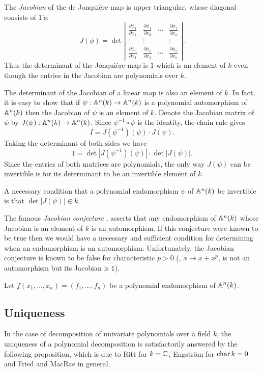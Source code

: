 The {\em Jacobian} of the de Jonqui\`ere map is upper triangular,
whose diagonal consists of $1$'s:
\[
J(\phi) = \det \left|
\begin{array}{cccc}
  \frac{\partial \phi_1}{\partial x_1} & 
    \frac{\partial \phi_1}{\partial x_2} & \cdots & 
    \frac{\partial \phi_1}{\partial x_n} \\
  \vdots & \vdots & & \vdots \\
  \frac{\partial \phi_n}{\partial x_1} & 
    \frac{\partial \phi_n}{\partial x_2} & \cdots & 
    \frac{\partial \phi_n}{\partial x_n} 
\end{array}
\right|.
\]
Thus the determinant of the Jonqui\`ere map is $1$ which is an element
of $k$ even though the entries in the Jacobian are polynomials over
$k$.

The determinant of the Jacobian of a linear map is also an element of
$k$.  In fact, it is easy to show that if $\psi: \mathbb{A}^{n}(k)
\rightarrow \mathbb{A}^n(k)$ is a polynomial automorphism of $\mathbb{A}^n(k)$
then the Jacobian of $\psi$ is an element of $k$.  Denote the Jacobian
matrix of $\psi$ by $J(\psi) : \mathbb{A}^n(k)\rightarrow \mathbb{A}^n(k)$.  Since
$\psi^{-1} \circ \psi$ is the identity, the chain rule gives
\[
I = J(\psi^{-1})(\psi) \cdot J(\psi).
\]
Taking the determinant of both sides we have
\[
1 = \det |J(\psi^{-1})(\psi)| \cdot \det |J(\psi)|.
\]
Since the entries of both matrices are polynomials, the only way
$J(\psi)$ can be invertible is for its determinant to be an invertible
element of $k$.

\begin{proposition}
A necessary condition that a polynomial endomorphism  $\psi$ of
$\mathbb{A}^n(k)$ be invertible is that $\det |J(\psi)| \in k$.
\end{proposition}

The famous {\em Jacobian conjecture} \cite{Keller39}, asserts that any
endomorphism of $\mathbb{A}^n(k)$ whose Jacobian is an element of $k$ is an
automorphism.  If this conjecture were known to be true then we would
have a necessary and sufficient condition for determining when an
endomorphism is an automorphism.  Unfortunately, the Jacobian
conjecture is known to be false for characteristic $p>0$ (\eg, $x
\mapsto x + x^p$, is not an automorphism but its Jacobian is $1$).

Let $f(x_1, \ldots, x_n) = (f_1,
\ldots, f_n)$ be a polynomial endomorphism of $\mathbb{A}^n(k)$. 


\subsection{Uniqueness}
\label{Decomposition:Uniqueness:Sec}
In the case of decomposition of univariate polynomials over a field
$k$, the uniqueness of a polynomial decomposition is satisfactorily
answered by the following proposition, which is due to Ritt
\cite{Ritt22a} for $k = \mathbb{C}$,  Engstr\"om \cite{Engstrom41} for $\mathop{\rm char}\nolimits
k = 0$ and Fried and MacRae \cite{Fried69} in general.

